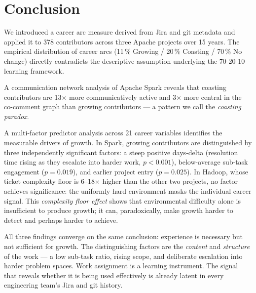 \documentclass[12pt,a4paper]{article}
\begin{document}
\section{Conclusion}

We introduced a career arc measure derived from Jira and git
metadata and applied it to 378 contributors across three Apache
projects over 15 years.
The empirical distribution of career arcs (11\,\% Growing /
20\,\% Coasting / 70\,\% No change) directly contradicts the
descriptive assumption underlying the 70-20-10 learning framework.

A communication network analysis of Apache Spark reveals that
coasting contributors are 13$\times$ more communicatively active
and 3$\times$ more central in the co-comment graph than growing
contributors --- a pattern we call the \textit{coasting paradox}.

A multi-factor predictor analysis across 21 career variables
identifies the measurable drivers of growth.
In Spark, growing contributors are distinguished by three
independently significant factors: a steep positive days-delta
(resolution time rising as they escalate into harder work,
$p < 0.001$), below-average sub-task engagement ($p = 0.019$),
and earlier project entry ($p = 0.025$).
In Hadoop, whose ticket complexity floor is 6--18$\times$ higher
than the other two projects, no factor achieves significance:
the uniformly hard environment masks the individual career signal.
This \textit{complexity floor effect} shows that environmental
difficulty alone is insufficient to produce growth; it can, paradoxically,
make growth harder to detect and perhaps harder to achieve.

All three findings converge on the same conclusion:
experience is necessary but not sufficient for growth.
The distinguishing factors are the \textit{content} and
\textit{structure} of the work --- a low sub-task ratio,
rising scope, and deliberate escalation into harder problem spaces.
Work assignment is a learning instrument.
The signal that reveals whether it is being used effectively
is already latent in every engineering team's Jira and git history.

\end{document}
